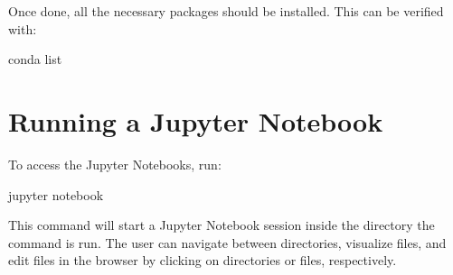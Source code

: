 \documentclass[letterpaper,10pt,english]{sphinxhowto}
\begin{document}
Once done, all the necessary packages should be installed. This can be verified with:

\begin{sphinxVerbatim}[commandchars=\\\{\}]
\PYGZdl{} conda list
\end{sphinxVerbatim}


\section{Running a Jupyter Notebook}
\label{\detokenize{index:running-a-jupyter-notebook}}
To access the Jupyter Notebooks, run:

\begin{sphinxVerbatim}[commandchars=\\\{\}]
\PYGZdl{} jupyter notebook
\end{sphinxVerbatim}

This command will start a Jupyter Notebook session inside the directory the command is run. The user can navigate between directories, visualize files, and edit files in the browser by clicking on directories or files, respectively.
\end{document}
